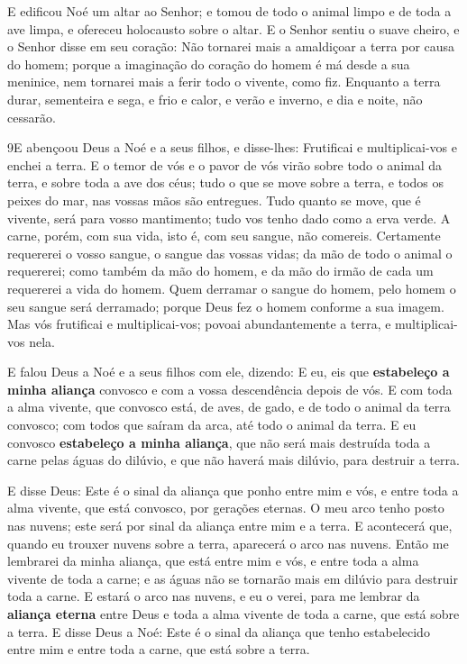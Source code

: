 E edificou Noé um altar ao Senhor; e tomou de todo o animal limpo
e de toda a ave limpa, e ofereceu holocausto sobre o altar. E
o Senhor sentiu o suave cheiro, e o Senhor disse em seu coração: Não
tornarei mais a amaldiçoar a terra por causa do homem; porque a
imaginação do coração do homem é má desde a sua meninice, nem
tornarei mais a ferir todo o vivente, como fiz. Enquanto a
terra durar, sementeira e sega, e frio e calor, e verão e inverno, e
dia e noite, não cessarão.

\smallskip

\lettrine{9} E abençoou Deus a Noé e a seus filhos, e
disse-lhes: Frutificai e multiplicai-vos e enchei a terra. E o
temor de vós e o pavor de vós virão sobre todo o animal da terra, e
sobre toda a ave dos céus; tudo o que se move sobre a terra, e todos
os peixes do mar, nas vossas mãos são entregues. Tudo quanto se
move, que é vivente, será para vosso mantimento; tudo vos tenho dado
como a erva verde. A carne, porém, com sua vida, isto é, com seu
sangue, não comereis. Certamente requererei o vosso sangue, o
sangue das vossas vidas; da mão de todo o animal o requererei; como
também da mão do homem, e da mão do irmão de cada um requererei a
vida do homem. Quem derramar o sangue do homem, pelo homem o seu
sangue será derramado; porque Deus fez o homem conforme a sua
imagem. Mas vós frutificai e multiplicai-vos; povoai
abundantemente a terra, e multiplicai-vos nela.

E falou Deus a Noé e a seus filhos com ele, dizendo: E eu, eis
que \textbf{estabeleço a minha aliança} convosco e com a vossa
descendência depois de vós. E com toda a alma vivente, que
convosco está, de aves, de gado, e de todo o animal da terra
convosco; com todos que saíram da arca, até todo o animal da terra.
E eu convosco \textbf{estabeleço a minha aliança}, que não
será mais destruída toda a carne pelas águas do dilúvio, e que não
haverá mais dilúvio, para destruir a terra.

E disse Deus: Este é o sinal da aliança que ponho entre mim e
vós, e entre toda a alma vivente, que está convosco, por gerações
eternas. O meu arco tenho posto nas nuvens; este será por
sinal da aliança entre mim e a terra. E acontecerá que,
quando eu trouxer nuvens sobre a terra, aparecerá o arco nas nuvens.
Então me lembrarei da minha aliança, que está entre mim e
vós, e entre toda a alma vivente de toda a carne; e as águas não se
tornarão mais em dilúvio para destruir toda a carne. E estará
o arco nas nuvens, e eu o verei, para me lembrar da \textbf{aliança
eterna} entre Deus e toda a alma vivente de toda a carne, que está
sobre a terra. E disse Deus a Noé: Este é o sinal da aliança
que tenho estabelecido entre mim e entre toda a carne, que está
sobre a terra.

